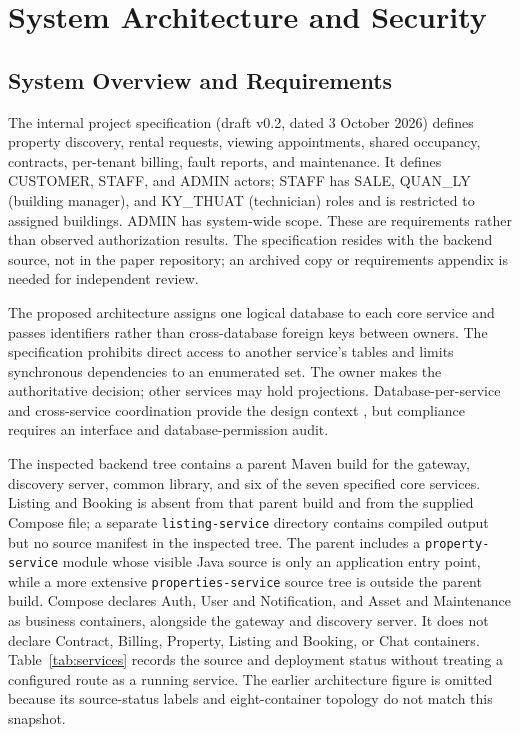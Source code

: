 \section{System Architecture and Security}\label{sec:architecture}

\subsection{System Overview and Requirements}
The internal project specification (draft v0.2, dated 3 October 2026) defines property discovery, rental requests, viewing appointments, shared occupancy, contracts, per-tenant billing, fault reports, and maintenance. It defines CUSTOMER, STAFF, and ADMIN actors; STAFF has SALE, QUAN\_LY (building manager), and KY\_THUAT (technician) roles and is restricted to assigned buildings. ADMIN has system-wide scope. These are requirements rather than observed authorization results. The specification resides with the backend source, not in the paper repository; an archived copy or requirements appendix is needed for independent review.

The proposed architecture assigns one logical database to each core service and passes identifiers rather than cross-database foreign keys between owners. The specification prohibits direct access to another service's tables and limits synchronous dependencies to an enumerated set. The owner makes the authoritative decision; other services may hold projections. Database-per-service and cross-service coordination provide the design context \cite{richardson2018microservices}, but compliance requires an interface and database-permission audit.

The inspected backend tree contains a parent Maven build for the gateway, discovery server, common library, and six of the seven specified core services. Listing and Booking is absent from that parent build and from the supplied Compose file; a separate \texttt{listing-service} directory contains compiled output but no source manifest in the inspected tree. The parent includes a \texttt{property-service} module whose visible Java source is only an application entry point, while a more extensive \texttt{properties-service} source tree is outside the parent build. Compose declares Auth, User and Notification, and Asset and Maintenance as business containers, alongside the gateway and discovery server. It does not declare Contract, Billing, Property, Listing and Booking, or Chat containers. Table~\ref{tab:services} records the source and deployment status without treating a configured route as a running service. The earlier architecture figure is omitted because its source-status labels and eight-container topology do not match this snapshot.

